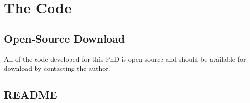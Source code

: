 \chapter{The Code}\label{appendix:the_code}

\section{Open-Source Download}

All of the code developed for this PhD is open-source and should be
available for download by contacting the author.

\section{README}

\lstset{basicstyle=\scriptsize}
